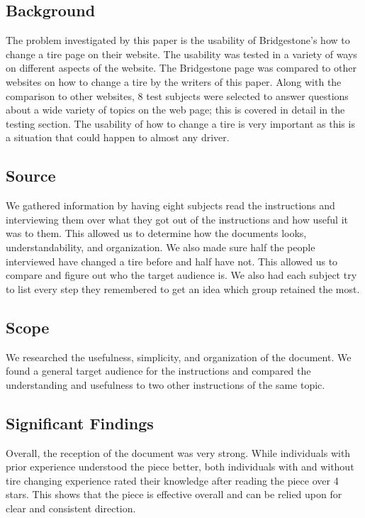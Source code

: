 \documentclass[12pt,A4paper]{article}
\begin{document}
		\subsection{Background}
		The problem investigated by this paper is the usability of Bridgestone’s how to change a tire page on their website. The usability was tested in a variety of ways on different aspects of the website. The Bridgestone page was compared to other websites on how to change a tire by the writers of this paper. Along with the comparison to other websites, 8 test subjects were selected to answer questions about a wide variety of topics on the web page; this is covered in detail in the testing section. The usability of how to change a tire is very important as this is a situation that could happen to almost any driver.

		\subsection{Source}
		We gathered information by having eight subjects read the instructions and interviewing them over what they got out of the instructions and how useful it was to them. This allowed us to determine how the documents looks, understandability, and organization. We also made sure half the people interviewed have changed a tire before and half have not. This allowed us to compare and figure out who the target audience is. We also had each subject try to list every step they remembered to get an idea which group retained the most.

		\subsection{Scope}
		We researched the usefulness, simplicity, and organization of the document. We found a general target audience for the instructions and compared the understanding and usefulness to two other instructions of the same topic.

		\subsection{Significant Findings}
		Overall, the reception of the document was very strong. While individuals with prior experience understood the piece better, both individuals with and without tire changing experience rated their knowledge after reading the piece over 4 stars. This shows that the piece is effective overall and can be relied upon for clear and consistent direction.
\end{document}
